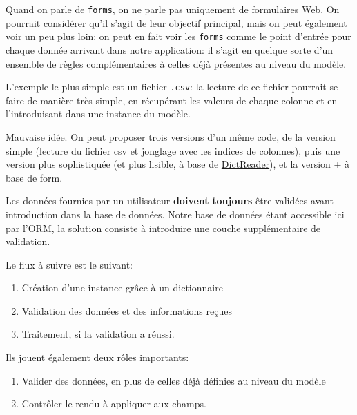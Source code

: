 \documentclass[11pt]{amsbook}
\begin{document}
Quand on parle de \texttt{forms}, on ne parle pas uniquement de formulaires Web. On pourrait considérer qu’il s’agit de leur objectif principal, mais on peut également voir un peu plus loin: on peut en fait voir les \texttt{forms} comme le point d’entrée pour chaque donnée arrivant dans notre application: il s’agit en quelque sorte d’un ensemble de règles complémentaires à celles déjà présentes au niveau du modèle.


L’exemple le plus simple est un fichier \texttt{.csv}: la lecture de ce fichier pourrait se faire de manière très simple, en récupérant les valeurs de chaque colonne et en l’introduisant dans une instance du modèle.


Mauvaise idée. On peut proposer trois versions d’un même code, de la version simple (lecture du fichier csv et jonglage avec les indices de colonnes), puis une version plus sophistiquée (et plus lisible, à base de \href{https://docs.python.org/3/library/csv.html#csv.DictReader}{DictReader}), et la version + à base de form.


Les données fournies par un utilisateur \textbf{doivent} \textbf{toujours} être validées avant introduction dans la base de données. Notre base de données étant accessible ici par l’ORM, la solution consiste à introduire une couche supplémentaire de validation.


Le flux à suivre est le suivant:


\begin{enumerate}

\item{Création d’une instance grâce à un dictionnaire}

\item{Validation des données et des informations reçues}

\item{Traitement, si la validation a réussi.}

\end{enumerate}


Ils jouent également deux rôles importants:


\begin{enumerate}

\item{Valider des données, en plus de celles déjà définies au niveau du modèle}

\item{Contrôler le rendu à appliquer aux champs.}

\end{enumerate}
\end{document}
